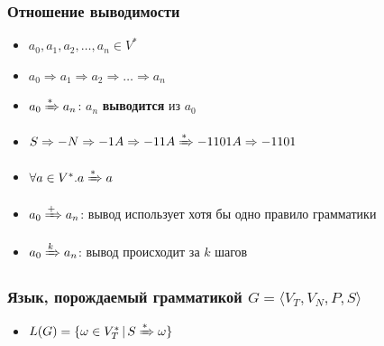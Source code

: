 \documentclass{beamer}
\begin{document}
\begin{frame}[fragile]
  \transwipe[direction=90]
  \frametitle{Отношение выводимости}
  \begin{itemize}
    \item $a_0, a_1, a_2, \dots, a_n \in V^*$
    \item $a_0 \Rightarrow a_1 \Rightarrow a_2 \Rightarrow \dots \Rightarrow a_n$
    \item $a_0 \xRightarrow[]{*} a_n$: $a_n$ \textbf{выводится} из $a_0$
  \end{itemize}

  \begin{itemize}
    \item $S \Rightarrow - N \Rightarrow - 1 A \Rightarrow - 1 1 A \xRightarrow[]{*} - 1 1 0 1 A \Rightarrow - 1 1 0 1$
  \end{itemize}
 \pause
  \begin{itemize}
    \item $\forall a \in V^*.a \xRightarrow[]{*} a$
  \end{itemize}

  \begin{itemize}
    \item $a_0 \xRightarrow[]{+} a_n$: вывод использует хотя бы одно правило грамматики
    \item $a_0 \xRightarrow[]{k} a_n$: вывод происходит за $k$ шагов
  \end{itemize}
\end{frame}


\begin{frame}[fragile]
  \transwipe[direction=90]
  \frametitle{Язык, порождаемый грамматикой $G = \langle V_T, V_N, P, S \rangle$}
  \begin{itemize}
    \item $L(G) = \{ \omega \in V_T^* \, | \, S \xRightarrow[]{*} \omega \}$
  \end{itemize}
\end{frame}
\end{document}
